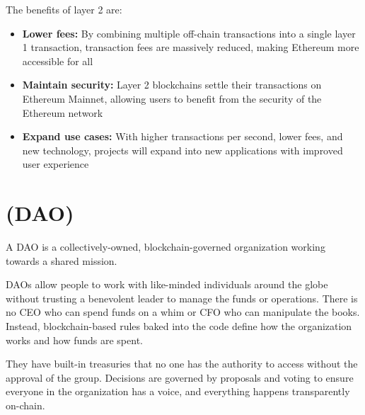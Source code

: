 \documentclass[MSE,Master,english]{twbook}%
\begin{document}
The benefits of layer 2 are:
\begin{itemize}
  \item \textbf{Lower fees:} By combining multiple off-chain transactions into a single layer 1 transaction, transaction fees are massively reduced, making Ethereum more accessible for all
  \item \textbf{Maintain security:} Layer 2 blockchains settle their transactions on Ethereum Mainnet, allowing users to benefit from the security of the Ethereum network
  \item \textbf{Expand use cases:} With higher transactions per second, lower fees, and new technology, projects will expand into new applications with improved user experience
\end{itemize}

\section{ (DAO)}
A DAO is a collectively-owned, blockchain-governed organization working towards a shared mission.

DAOs allow people to work with like-minded individuals around the globe without trusting a benevolent leader to manage the funds or operations. There is no CEO who can spend funds on a whim or CFO who can manipulate the books. Instead, blockchain-based rules baked into the code define how the organization works and how funds are spent.

They have built-in treasuries that no one has the authority to access without the approval of the group. Decisions are governed by proposals and voting to ensure everyone in the organization has a voice, and everything happens transparently on-chain.\cite{DAO} \\
\end{document}
